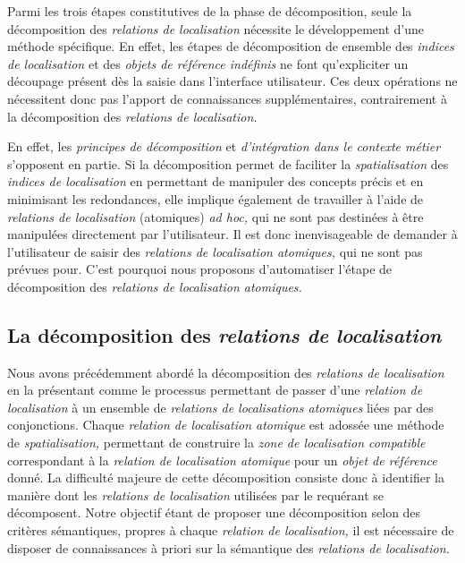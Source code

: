 Parmi les trois étapes constitutives de la phase de décomposition,
seule la décomposition des \emph{relations de localisation} nécessite
le développement d'une méthode spécifique. En effet, les étapes de
décomposition de ensemble des \emph{indices de localisation} et des
\emph{objets de référence indéfinis} ne font qu'expliciter un
découpage présent dès la saisie dans l'interface utilisateur. Ces deux
opérations ne nécessitent donc pas l'apport de connaissances
supplémentaires, contrairement à la décomposition des \emph{relations
  de localisation.}

En effet, les \emph{principes de décomposition} et \emph{d'intégration
  dans le contexte métier} s'opposent en partie. Si la décomposition
permet de faciliter la \emph{spatialisation} des \emph{indices de
  localisation} en permettant de manipuler des concepts précis et en
minimisant les redondances, elle implique également de travailler à
l'aide de \emph{relations de localisation} (atomiques) \emph{ad hoc,}
qui ne sont pas destinées à être manipulées directement par
l'utilisateur. Il est donc inenvisageable de demander à l'utilisateur
de saisir des \emph{relations de localisation atomiques,} qui ne sont
pas prévues pour. C'est pourquoi nous proposons d'automatiser l'étape
de décomposition des \emph{relations de localisation atomiques.}

\subsection{La décomposition des \emph{relations de localisation}}

Nous avons précédemment abordé la décomposition des \emph{relations de
  localisation} en la présentant comme le processus permettant de
passer d'une \emph{relation de localisation} à un ensemble de
\emph{relations de localisations atomiques} liées par des
conjonctions. Chaque \emph{relation de localisation atomique} est
adossée une méthode de \emph{spatialisation,} permettant de construire
la \emph{zone de localisation compatible} correspondant à la
\emph{relation de localisation atomique} pour un \emph{objet de
  référence} donné. La difficulté majeure de cette décomposition
consiste donc à identifier la manière dont les \emph{relations de
  localisation} utilisées par le requérant se décomposent. Notre
objectif étant de proposer une décomposition selon des critères
sémantiques, propres à chaque \emph{relation de localisation,} il est
nécessaire de disposer de connaissances à priori sur la sémantique des
\emph{relations de localisation.}

